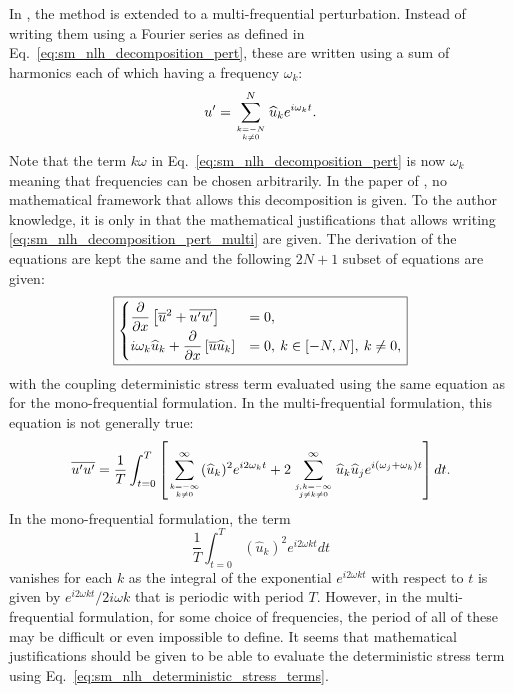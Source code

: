 In \citet{He2002}, the method is extended to a multi-frequential
perturbation. Instead of writing them
using a Fourier series as defined in Eq.~\ref{eq:sm_nlh_decomposition_pert},
these are written using a sum of harmonics each of which
having a frequency $\omega_k$:
\begin{equation}
	u^\prime = \sum_{k=-N \atop k \neq 0}^{N} 
	\widehat{u}_k e^{i \omega_k t}.
	\label{eq:sm_nlh_decomposition_pert_multi}
\end{equation}
Note that the term $k \omega$ in Eq.~\ref{eq:sm_nlh_decomposition_pert}
is now $\omega_k$ meaning that frequencies can be chosen
arbitrarily. In the paper of \citet{He2002}, no mathematical
framework that allows this decomposition is given. To the author
knowledge, it is only in \cite{JGuedeney2013} that the mathematical
justifications that allows writing 
\ref{eq:sm_nlh_decomposition_pert_multi} are given.
The derivation of the equations are kept the same and the following
$2N+1$ subset of equations are given:
\begin{equation}
	\fbox{$
	\begin{cases}
		\displaystyle 
		\frac{\partial}{\partial x}
			\left[\overline{u}^2 + 
			\overline{u^\prime u^\prime}\right] &=
			0, \\
		\displaystyle
		i \omega_k \widehat{u}_k + 
			\frac{\partial}{\partial x} 
			\left[ \overline{u} \widehat{u}_k\right] &= 
			0, \: k \in [-N, N], \: k \neq 0,
	\end{cases}
	$}
	\label{eq:sm_nlh_subset_eq_multi}
\end{equation}
with the coupling deterministic stress term evaluated using the
same equation as for the mono-frequential formulation.
In the multi-frequential formulation, this equation is
not generally true:
\begin{equation}
	\overline{u^\prime u^\prime} = 
	\frac{1}{T} \int_{t=0}^{T} \left[ 
		\sum_{k=-\infty \atop k \neq 0}^{\infty} (\widehat{u}_k)^2
	   	e^{i 2 \omega_k t} +
	   	2 \sum_{j,k=-\infty \atop j \neq k \neq 0}^{\infty} 
	   	\widehat{u}_k \widehat{u}_j e^{i (\omega_j + \omega_k) t} 
	\right] dt.
\end{equation}
In the mono-frequential formulation, the term
\begin{equation}
	\frac{1}{T} \int_{t=0}^{T} (\widehat{u}_k)^2
		e^{i 2 \omega k t} dt
\end{equation}
vanishes for each $k$ as the integral of the
exponential $e^{i 2 \omega k t}$ with respect to $t$
is given by $e^{i 2 \omega k t} / 2 i \omega k$ that is
periodic with period $T$. However, in the multi-frequential
formulation, for some choice of frequencies, the period of all
of these may be difficult or even impossible to define. It
seems that mathematical justifications should be given
to be able to evaluate the deterministic stress term 
using Eq.~\ref{eq:sm_nlh_deterministic_stress_terms}.

